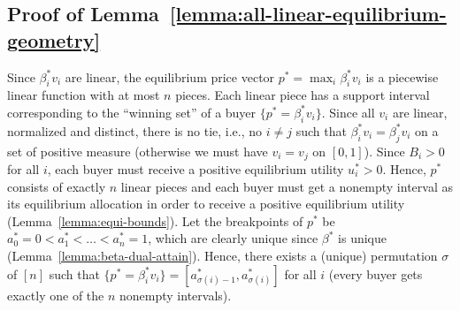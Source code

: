 	\subsection*{Proof of Lemma~\ref{lemma:all-linear-equilibrium-geometry}}
		Since $\beta^*_i v_i$ are linear, the equilibrium price vector $p^* = \max_i \beta^*_i v_i$ is a piecewise linear function with at most $n$ pieces. Each linear piece has a support interval corresponding to the ``winning set'' of a buyer $\{p^* = \beta^*_i v_i\}$.
		Since all $v_i$ are linear, normalized and distinct, there is no tie, i.e., no $i\neq j$ such that $\beta^*_i v_i = \beta^*_j v_i$ on a set of positive measure (otherwise we must have $v_i = v_j$ on $[0,1]$).
		Since $B_i>0$ for all $i$, each buyer must receive a positive equilibrium utility $u^*_i>0$. 
		Hence, $p^*$ consists of exactly $n$ linear pieces and each buyer must get a nonempty interval as its equilibrium allocation in order to receive a positive equilibrium utility (Lemma~\ref{lemma:equi-bounds}).
		Let the breakpoints of $p^*$ be $a^*_0 = 0 < a^*_1 < \dots < a^*_n = 1$, which are clearly unique since $\beta^*$ is unique (Lemma~\ref{lemma:beta-dual-attain}). 
		Hence, there exists a (unique) permutation $\sigma$ of $[n]$ such that $\{ p^* = \beta^*_i v_i \} = [a^*_{\sigma(i)-1}, a^*_{\sigma(i)}]$ for all $i$ (every buyer gets exactly one of the $n$ nonempty intervals). 
		
